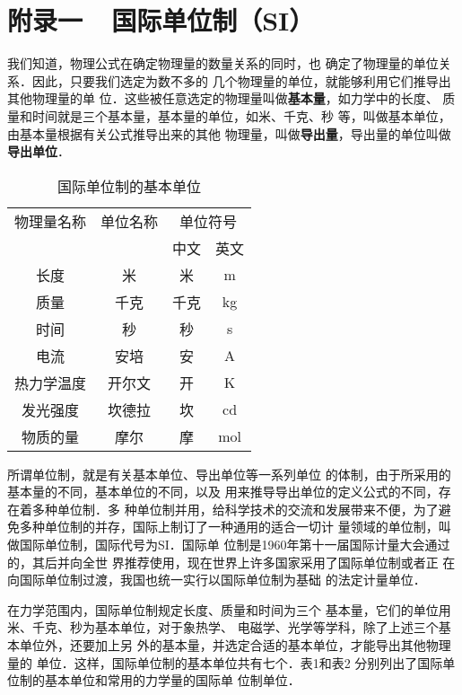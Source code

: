 \chapter{附录一~~国际单位制（SI）}

我们知道，物理公式在确定物理量的数量关系的同时，也
确定了物理量的单位关系．因此，只要我们选定为数不多的
几个物理量的单位，就能够利用它们推导出其他物理量的单
位．这些被任意选定的物理量叫做\textbf{基本量}，如力学中的长度、
质量和时间就是三个基本量，基本量的单位，如米、千克、秒
等，叫做基本单位，由基本量根据有关公式推导出来的其他
物理量，叫做\textbf{导出量}，导出量的单位叫做\textbf{导出单位}．
\begin{table}[htp]
    \centering
    \caption{国际单位制的基本单位}
\begin{tabular}{cccc}
    \hline
    物理量名称 & 单位名称 & \multicolumn{2}{c}{单位符号}\\
&&中文 & 英文\\
\hline
长度 & 米 & 米 & m\\
质量 & 千克 & 千克 &kg\\
时间 & 秒 & 秒 &s\\
电流 & 安培 & 安 &A\\ 
热力学温度 & 开尔文 & 开 &K\\ 
发光强度 & 坎德拉 & 坎 & cd\\
物质的量 & 摩尔 & 摩 & mol\\
\hline
\end{tabular}
\end{table}

所谓单位制，就是有关基本单位、导出单位等一系列单位
的体制，由于所采用的基本量的不同，基本单位的不同，以及
用来推导导出单位的定义公式的不同，存在着多种单位制．多
种单位制并用，给科学技术的交流和发展带来不便，为了避
免多种单位制的并存，国际上制订了一种通用的适合一切计
量领域的单位制，叫做国际单位制，国际代号为SI．国际单
位制是1960年第十一届国际计量大会通过的，其后并向全世
界推荐使用，现在世界上许多国家采用了国际单位制或者正
在向国际单位制过渡，我国也统一实行以国际单位制为基础
的法定计量单位．

在力学范围内，国际单位制规定长度、质量和时间为三个
基本量，它们的单位用米、千克、秒为基本单位，对于象热学、
电磁学、光学等学科，除了上述三个基本单位外，还要加上另
外的基本量，并选定合适的基本单位，才能导出其他物理量的
单位．这样，国际单位制的基本单位共有七个．表1和表2
分别列出了国际单位制的基本单位和常用的力学量的国际单
位制单位．



